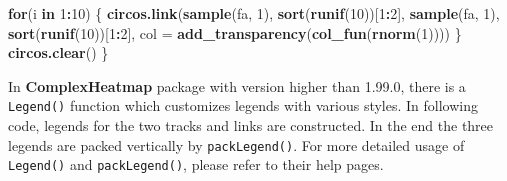 \documentclass[]{book}
\newenvironment{Shaded}{\begin{snugshade}}{\end{snugshade}}
\newcommand{\KeywordTok}[1]{\textcolor[rgb]{0.13,0.29,0.53}{\textbf{#1}}}
\newcommand{\DataTypeTok}[1]{\textcolor[rgb]{0.13,0.29,0.53}{#1}}
\newcommand{\DecValTok}[1]{\textcolor[rgb]{0.00,0.00,0.81}{#1}}
\newcommand{\ControlFlowTok}[1]{\textcolor[rgb]{0.13,0.29,0.53}{\textbf{#1}}}
\newcommand{\OperatorTok}[1]{\textcolor[rgb]{0.81,0.36,0.00}{\textbf{#1}}}
\newcommand{\NormalTok}[1]{#1}
\begin{document}
\begin{Shaded}
\begin{Highlighting}[]
    \ControlFlowTok{for}\NormalTok{(i }\ControlFlowTok{in} \DecValTok{1}\OperatorTok{:}\DecValTok{10}\NormalTok{) \{}
        \KeywordTok{circos.link}\NormalTok{(}\KeywordTok{sample}\NormalTok{(fa, }\DecValTok{1}\NormalTok{), }\KeywordTok{sort}\NormalTok{(}\KeywordTok{runif}\NormalTok{(}\DecValTok{10}\NormalTok{))[}\DecValTok{1}\OperatorTok{:}\DecValTok{2}\NormalTok{], }
                    \KeywordTok{sample}\NormalTok{(fa, }\DecValTok{1}\NormalTok{), }\KeywordTok{sort}\NormalTok{(}\KeywordTok{runif}\NormalTok{(}\DecValTok{10}\NormalTok{))[}\DecValTok{1}\OperatorTok{:}\DecValTok{2}\NormalTok{],}
                    \DataTypeTok{col =} \KeywordTok{add_transparency}\NormalTok{(}\KeywordTok{col_fun}\NormalTok{(}\KeywordTok{rnorm}\NormalTok{(}\DecValTok{1}\NormalTok{))))}
\NormalTok{    \}}
    \KeywordTok{circos.clear}\NormalTok{()}
\NormalTok{\}}
\end{Highlighting}
\end{Shaded}

In \textbf{ComplexHeatmap} package with version higher than 1.99.0,
there is a \texttt{Legend()} function which customizes legends with
various styles. In following code, legends for the two tracks and links
are constructed. In the end the three legends are packed vertically by
\texttt{packLegend()}. For more detailed usage of \texttt{Legend()} and
\texttt{packLegend()}, please refer to their help pages.
\end{document}
